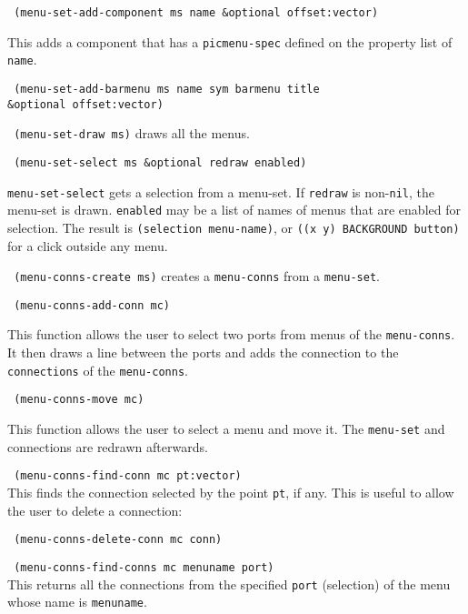 {\tt \hspace*{0.5in} (menu-set-add-component ms name \&optional offset:vector)}

This adds a component that has a {\tt picmenu-spec} defined on the
property list of {\tt name}.

{\tt \hspace*{0.5in} (menu-set-add-barmenu ms name sym barmenu title} \\
\hspace*{1.5in} {\tt \&optional offset:vector)}

{\tt \hspace*{0.5in} (menu-set-draw ms)} draws all the menus.

{\tt \hspace*{0.5in} (menu-set-select ms \&optional redraw enabled)}

{\tt menu-set-select} gets a selection from a menu-set.  If {\tt redraw}
is non-{\tt nil}, the menu-set is drawn.  {\tt enabled} may be a list
of names of menus that are enabled for selection.  The result is
{\tt (selection menu-name)}, or {\tt ((x y) BACKGROUND button)}
for a click outside any menu.


{\tt \hspace*{0.5in} (menu-conns-create ms)} creates a {\tt menu-conns}
from a {\tt menu-set}.

{\tt \hspace*{0.5in} (menu-conns-add-conn mc)}

This function allows the user to select two ports from menus of the
{\tt menu-conns}.  It then draws a line between the ports and adds the
connection to the {\tt connections} of the {\tt menu-conns}.

{\tt \hspace*{0.5in} (menu-conns-move mc)}

This function allows the user to select a menu and move it.
The {\tt menu-set} and connections are redrawn afterwards.

{\tt \hspace*{0.5in} (menu-conns-find-conn mc pt:vector)} \\
This finds the connection selected by the point {\tt pt}, if any.
This is useful to allow the user to delete a connection:

{\tt \hspace*{0.5in} (menu-conns-delete-conn mc conn)}

{\tt \hspace*{0.5in} (menu-conns-find-conns mc menuname port)} \\
This returns all the connections from the specified {\tt port} (selection)
of the menu whose name is {\tt menuname}.


